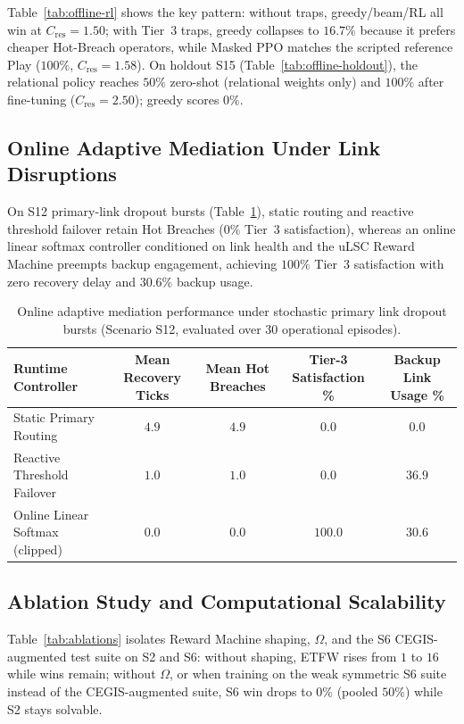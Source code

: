 Table~\ref{tab:offline-rl} shows the key pattern: without traps, greedy/beam/RL all win at $C_{\mathrm{res}} = 1.50$; with Tier~3 traps, greedy collapses to $16.7\%$ because it prefers cheaper Hot-Breach operators, while Masked PPO matches the scripted reference Play ($100\%$, $C_{\mathrm{res}} = 1.58$).  On holdout S15 (Table~\ref{tab:offline-holdout}), the relational policy reaches $50\%$ zero-shot (relational weights only) and $100\%$ after fine-tuning ($C_{\mathrm{res}} = 2.50$); greedy scores $0\%$.

\subsection{Online Adaptive Mediation Under Link Disruptions} \label{sec:res-online-rl}

On S12 primary-link dropout bursts (Table~\ref{tab:online-rl}), static routing and reactive threshold failover retain Hot Breaches ($0\%$ Tier~3 satisfaction), whereas an online linear softmax controller conditioned on link health and the uLSC Reward Machine preempts backup engagement, achieving $100\%$ Tier~3 satisfaction with zero recovery delay and $30.6\%$ backup usage.

\begin{table}[t]
\centering
\caption{Online adaptive mediation performance under stochastic primary link dropout bursts (Scenario S12, evaluated over $30$ operational episodes).}
\label{tab:online-rl}
\footnotesize
\begin{tabular}{@{}lcccc@{}}
\toprule
\textbf{Runtime Controller} & \textbf{Mean Recovery Ticks} & \textbf{Mean Hot Breaches} & \textbf{Tier-3 Satisfaction \%} & \textbf{Backup Link Usage \%} \\
\midrule
Static Primary Routing & $4.9$ & $4.9$ & $0.0$ & $0.0$ \\
Reactive Threshold Failover & $1.0$ & $1.0$ & $0.0$ & $36.9$ \\
Online Linear Softmax (clipped) & $0.0$ & $0.0$ & $100.0$ & $30.6$ \\
\bottomrule
\end{tabular}
\end{table}

\subsection{Ablation Study and Computational Scalability} \label{sec:res-ablations}

Table~\ref{tab:ablations} isolates Reward Machine shaping, $\Omega$, and the S6 CEGIS-augmented test suite on S2 and S6: without shaping, ETFW rises from $1$ to $16$ while wins remain; without $\Omega$, or when training on the weak symmetric S6 suite instead of the CEGIS-augmented suite, S6 win drops to $0\%$ (pooled $50\%$) while S2 stays solvable.

